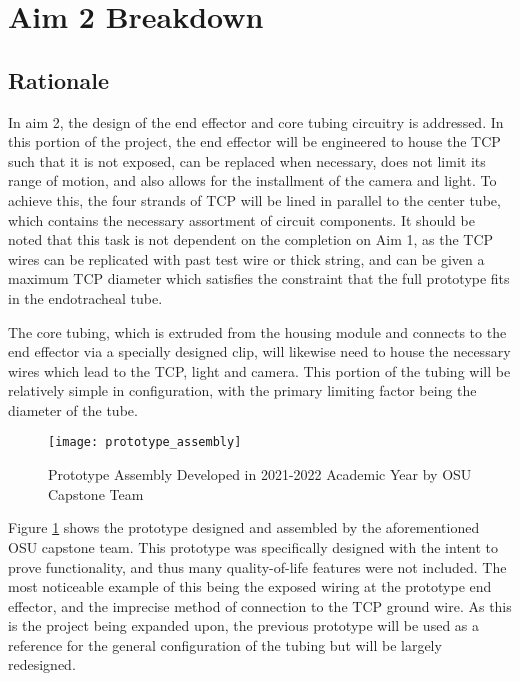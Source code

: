 \section{Aim 2 Breakdown}

\subsection{Rationale}

	In aim 2, the design of the end effector and core tubing circuitry is addressed. In this portion of the project, the end effector will be engineered to house the TCP such that it is not exposed, can be replaced when necessary, does not limit its range of motion, and also allows for the installment of the camera and light. To achieve this, the four strands of TCP will be lined in parallel to the center tube, which contains the necessary assortment of circuit components. It should be noted that this task is not dependent on the completion on Aim 1, as the TCP wires can be replicated with past test wire or thick string, and can be given a maximum TCP diameter which satisfies the constraint that the full prototype fits in the endotracheal tube.

	The core tubing, which is extruded from the housing module and connects to the end effector via a specially designed clip, will likewise need to house the necessary wires which lead to the TCP, light and camera. This portion of the tubing will be relatively simple in configuration, with the primary limiting factor being the diameter of the tube.

	\begin{figure}[ht]
		\centering
		\texttt{[image: prototype\_assembly]}
		\caption{Prototype Assembly Developed in 2021-2022 Academic Year by OSU Capstone Team}
		\label{fig:prototype_assembly}
	\end{figure}
	
	Figure \ref{fig:prototype_assembly} shows the prototype designed and assembled by the aforementioned OSU capstone team. This prototype was specifically designed with the intent to prove functionality, and thus many quality-of-life features were not included. The most noticeable example of this being the exposed wiring at the prototype end effector, and the imprecise method of connection to the TCP ground wire. As this is the project being expanded upon, the previous prototype will be used as a reference for the general configuration of the tubing but will be largely redesigned.

